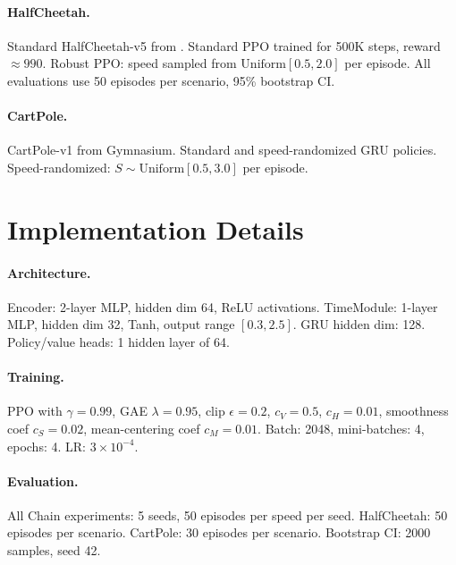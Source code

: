 \documentclass[10pt,twocolumn]{article}
\theoremstyle{plain}
\theoremstyle{definition}
\begin{document}
\paragraph{HalfCheetah.}
Standard HalfCheetah-v5 from \cite{todorov2012mujoco}.
Standard PPO trained for 500K steps, reward $\approx 990$.
Robust PPO: speed sampled from $\mathrm{Uniform}[0.5, 2.0]$ per episode.
All evaluations use 50 episodes per scenario, 95\% bootstrap CI.

\paragraph{CartPole.}
CartPole-v1 from Gymnasium. Standard and speed-randomized GRU policies.
Speed-randomized: $S \sim \mathrm{Uniform}[0.5, 3.0]$ per episode.

\section{Implementation Details}
\label{app:impl}

\paragraph{Architecture.}
Encoder: 2-layer MLP, hidden dim 64, ReLU activations.
TimeModule: 1-layer MLP, hidden dim 32, Tanh, output range $[0.3, 2.5]$.
GRU hidden dim: 128. Policy/value heads: 1 hidden layer of 64.

\paragraph{Training.}
PPO with $\gamma = 0.99$, GAE $\lambda = 0.95$, clip $\epsilon = 0.2$,
$c_V = 0.5$, $c_H = 0.01$, smoothness coef $c_S = 0.02$, mean-centering
coef $c_M = 0.01$. Batch: 2048, mini-batches: 4, epochs: 4. LR: $3\times 10^{-4}$.

\paragraph{Evaluation.}
All Chain experiments: 5 seeds, 50 episodes per speed per seed.
HalfCheetah: 50 episodes per scenario. CartPole: 30 episodes per scenario.
Bootstrap CI: 2000 samples, seed 42.
\end{document}
